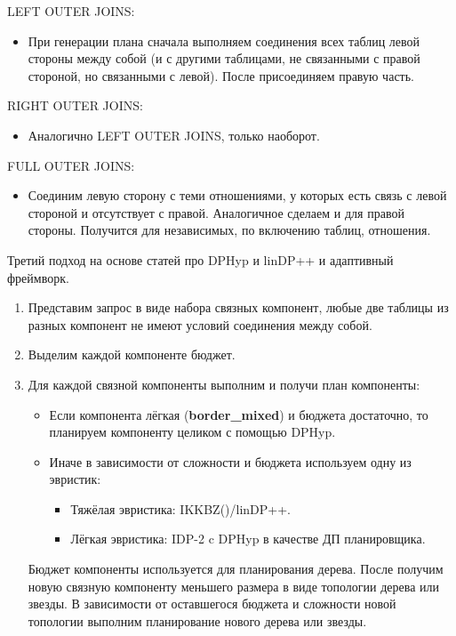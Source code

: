 \documentclass[12pt]{article}
\begin{document}
\begin{flushleft}
LEFT OUTER JOINS: 
\begin{itemize}[label={}]
    \item При генерации плана сначала выполняем соединения всех таблиц левой стороны между собой (и с другими таблицами, не связанными с правой стороной, но связанными с левой). После присоединяем правую часть.
\end{itemize}

RIGHT OUTER JOINS:
\begin{itemize}[label={}]
    \item Аналогично LEFT OUTER JOINS, только наоборот.
\end{itemize}

FULL OUTER JOINS:
\begin{itemize}[label={}]
    \item Соединим левую сторону с теми отношениями, у которых есть связь с левой стороной и отсутствует с правой. Аналогичное сделаем и для правой стороны.
    Получится для независимых, по включению таблиц, отношения.
\end{itemize}

\begin{center}
Третий подход на основе статей про DPHyp\cite{DPhyp} и linDP++\cite{LinDP} и адаптивный фреймворк\cite{Adaptive}.
\end{center}
\begin{enumerate}
    \item Представим запрос в виде набора связных компонент, любые две таблицы из разных компонент не имеют условий соединения между собой. 
    \item Выделим каждой компоненте бюджет.
    \item Для каждой связной компоненты выполним и получи план компоненты:
    \begin{itemize}[label={}]
        \item Если компонента лёгкая (\textbf{border\_mixed}) и бюджета достаточно, то планируем компоненту целиком с помощью DPHyp.
        \item Иначе в зависимости от сложности и бюджета используем одну из эвристик:
        \begin{itemize}[label={}]
            \item Тяжёлая эвристика: IKKBZ(\cite{IK}\cite{KBZ})/linDP++.
            \item Лёгкая эвристика: IDP-2 c DPHyp в качестве ДП планировщика.
        \end{itemize}
    \end{itemize}
    Бюджет компоненты используется для планирования дерева. После получим новую связную компоненту меньшего размера в виде топологии дерева или звезды.
    В зависимости от оставшегося бюджета и сложности новой топологии выполним планирование нового дерева или звезды.
    \newline
    

\end{enumerate}
\end{flushleft}
\end{document}
